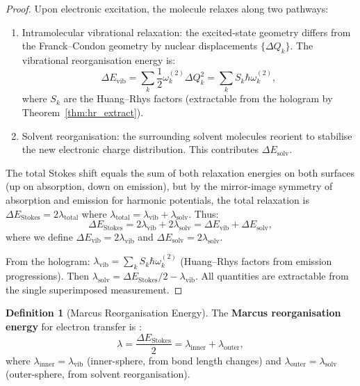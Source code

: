 \documentclass[11pt,a4paper]{article}
\theoremstyle{definition}
\newtheorem{definition}[theorem]{Definition}
\theoremstyle{remark}
\begin{document}
\begin{proof}
Upon electronic excitation, the molecule relaxes along two pathways:
\begin{enumerate}[label=(\roman*)]
  \item Intramolecular vibrational relaxation: the excited-state geometry differs from the Franck--Condon geometry by nuclear displacements $\{\Delta Q_k\}$. The vibrational reorganisation energy is:
  \begin{equation}
  \Delta E_{\mathrm{vib}} = \sum_k \frac{1}{2} \omega_k^{(2)} \Delta Q_k^2 = \sum_k S_k \hbar \omega_k^{(2)},
  \end{equation}
  where $S_k$ are the Huang--Rhys factors (extractable from the hologram by Theorem~\ref{thm:hr_extract}).
  \item Solvent reorganisation: the surrounding solvent molecules reorient to stabilise the new electronic charge distribution. This contributes $\Delta E_{\mathrm{solv}}$.
\end{enumerate}

The total Stokes shift equals the sum of both relaxation energies on both surfaces (up on absorption, down on emission), but by the mirror-image symmetry of absorption and emission for harmonic potentials, the total relaxation is $\Delta E_{\mathrm{Stokes}} = 2\lambda_{\mathrm{total}}$ where $\lambda_{\mathrm{total}} = \lambda_{\mathrm{vib}} + \lambda_{\mathrm{solv}}$. Thus:
\begin{equation}
\Delta E_{\mathrm{Stokes}} = 2\lambda_{\mathrm{vib}} + 2\lambda_{\mathrm{solv}} = \Delta E_{\mathrm{vib}} + \Delta E_{\mathrm{solv}},
\end{equation}
where we define $\Delta E_{\mathrm{vib}} = 2\lambda_{\mathrm{vib}}$ and $\Delta E_{\mathrm{solv}} = 2\lambda_{\mathrm{solv}}$.

From the hologram: $\lambda_{\mathrm{vib}} = \sum_k S_k \hbar\omega_k^{(2)}$ (Huang--Rhys factors from emission progressions). Then $\lambda_{\mathrm{solv}} = \Delta E_{\mathrm{Stokes}}/2 - \lambda_{\mathrm{vib}}$. All quantities are extractable from the single superimposed measurement.
\end{proof}

\begin{definition}[Marcus Reorganisation Energy]
\label{def:marcus}
The \textbf{Marcus reorganisation energy} for electron transfer is \citep{marcus1956}:
\begin{equation}
\lambda = \frac{\Delta E_{\mathrm{Stokes}}}{2} = \lambda_{\mathrm{inner}} + \lambda_{\mathrm{outer}},
\end{equation}
where $\lambda_{\mathrm{inner}} = \lambda_{\mathrm{vib}}$ (inner-sphere, from bond length changes) and $\lambda_{\mathrm{outer}} = \lambda_{\mathrm{solv}}$ (outer-sphere, from solvent reorganisation).
\end{definition}
\end{document}

